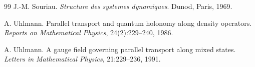 \begin{thebibliography}{99}
J.-M. Souriau.
\newblock \emph{Structure des systemes dynamiques}.
\newblock Dunod, Paris, 1969.

A. Uhlmann.
\newblock Parallel transport and quantum holonomy along density operators.
\newblock \emph{Reports on Mathematical Physics}, 24(2):229--240, 1986.

A. Uhlmann.
\newblock A gauge field governing parallel transport along mixed states.
\newblock \emph{Letters in Mathematical Physics}, 21:229--236, 1991.

\end{thebibliography}

